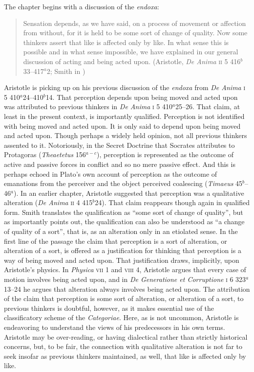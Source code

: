 The chapter begins with a discussion of the \emph{endoxa}:
\begin{quote}
	Sensation depends, as we have said, on a process of movement or affection from without, for it is held to be some sort of change of quality. Now some thinkers assert that like is affected only by like. In what sense this is possible and in what sense impossible, we have explained in our general discussion of acting and being acted upon. (Aristotle, \emph{De Anima} \textsc{ii} 5 416\( ^{b} \)33--417\( ^{a} \)2; Smith in \citealt[29]{Barnes:1984uq})
\end{quote}
Aristotle is picking up on his previous discussion of the \emph{endoxa} from \emph{De Anima} \textsc{i} 5 410\( ^{a} \)24--410\( ^{b} \)14. That perception depends upon being moved and acted upon was attributed to previous thinkers in \emph{De Anima} \textsc{i} 5 410\( ^{a} \)25--26. That claim, at least in the present context, is importantly qualified. Perception is not identified with being moved and acted upon. It is only said to depend upon being moved and acted upon. Though perhaps a widely held opinion, not all previous thinkers assented to it. Notoriously, in the Secret Doctrine that Socrates attributes to Protagoras (\emph{Theaetetus} 156\( ^{a-c} \)), perception is represented as the outcome of active and passive forces in conflict and so no mere passive effect. And this is perhaps echoed in Plato's own account of perception as the outcome of emanations from the perceiver and the object perceived coalescing (\emph{Timaeus} 45\( ^{b} \)--46\( ^{a} \)). In an earlier chapter, Aristotle suggested that perception was a qualitative alteration (\emph{De Anima} \textsc{ii} 4 415\( ^{b} \)24). That claim reappears though again in qualified form. Smith translates the qualification as ``some sort of change of quality'', but as \citet[36--37]{Burnyeat:2002an} importantly points out, the qualification can also be understood as ``a change of quality of a sort'', that is, as an alteration only in an etiolated sense. In the first line of the passage the claim that perception is a sort of alteration, or alteration of a sort, is offered as a justification for thinking that perception is a way of being moved and acted upon. That justification draws, implicitly, upon Aristotle's physics. In \emph{Physica} \textsc{vii} 1 and \textsc{viii} 4, Aristotle argues that every case of motion involves being acted upon, and in \emph{De Generatione et Corruptione} \textsc{i} 6 323\( ^{a} \)13--24 he argues that alteration always involves being acted upon. The attribution of the claim that perception is some sort of alteration, or alteration of a sort, to previous thinkers is doubtful, however, as it makes essential use of the classificatory scheme of the \emph{Categoriae}. Here, as is not uncommon, Aristotle is endeavoring to understand the views of his predecessors in his own terms. Aristotle may be over-reading, or having dialectical rather than strictly historical concerns, but, to be fair, the connection with qualitative alteration is not far to seek insofar as previous thinkers maintained, as well, that like is affected only by like.

